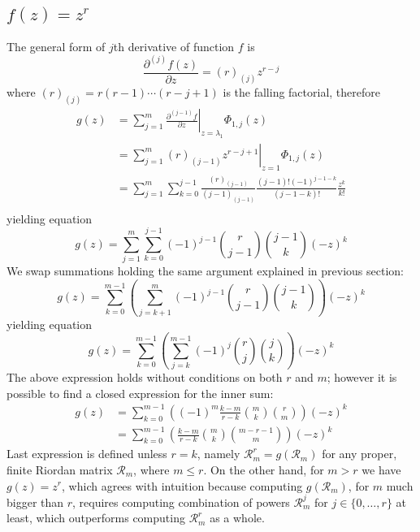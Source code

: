 \subsection{$f(z)=z^{r}$}

The general form of $j$th derivative of function $f$ is 
$$\frac{\partial^{(j)}{f}(z)}{\partial{z}} = (r)_{(j)} z^{r-j}$$ 
where $(r)_{(j)} = r(r-1)\cdots(r-j+1)$ is the falling factorial, therefore
\begin{displaymath}
\begin{split}
  g(z) &= \sum_{j=1}^{m}{ \left. \frac{\partial^{(j-1)}{f}}{\partial{z}} \right|_{z=\lambda_{1}}\Phi_{1,j}(z)} \\
       &= \sum_{j=1}^{m}{ \left. (r)_{(j-1)} z^{r-j+1} \right|_{z=1}\Phi_{1,j}(z)} \\
       &= \sum_{j=1}^{m}{\sum_{k=0}^{j-1}{\frac{(r)_{(j-1)}}{(j-1)_{(j-1)}}\frac{(j-1)!(-1)^{j-1-k}}{(j-1-k)!}\frac{z^{k}}{k!}}} \\
\end{split}
\end{displaymath}
yielding equation
\begin{equation}
  g(z) = \sum_{j=1}^{m}{\sum_{k=0}^{j-1}{(-1)^{j-1}{{r}\choose{j-1}}{{j-1}\choose{k}}(-z)^{k}}} 
\end{equation}
We swap summations holding the same argument explained in previous section:
\begin{displaymath}
  g(z) = \sum_{k=0}^{m-1}{\left(\sum_{j=k+1}^{m}{(-1)^{j-1}{{r}\choose{j-1}}{{j-1}\choose{k}}}\right)(-z)^{k}}
\end{displaymath}
yielding equation
\begin{equation}
  g(z) = \sum_{k=0}^{m-1}{\left(\sum_{j=k}^{m-1}{(-1)^{j}{{r}\choose{j}}{{j}\choose{k}}}\right)(-z)^{k}}
\end{equation}
The above expression holds without conditions on both $r$ and $m$; however it is possible 
to find a closed expression for the inner sum:
\begin{eqnarray}
  g(z) &= \sum_{k=0}^{m-1}{\left(\left(-1\right)^{m}\frac{ k - m }{r-k}{\binom{m}{k}} {\binom{r}{m}}\right)(-z)^{k}}\\
       &= \sum_{k=0}^{m-1}{\left(\frac{ k - m }{r-k}{\binom{m}{k}} {\binom{m-r-1}{m}}\right)(-z)^{k}}
\end{eqnarray}
Last expression is defined unless $r=k$, namely $\mathcal{R}_{m}^{r}=g(\mathcal{R}_{m})$ for any proper, 
finite Riordan matrix $\mathcal{R}_{m}$, where $m\leq r$. On the other hand, for $m>r$ we have 
$g(z)=z^{r}$, which agrees with intuition because computing $g(\mathcal{R}_{m})$, for $m$ much bigger than $r$, 
requires computing combination of powers $\mathcal{R}_{m}^{j}$ for $j\in \lbrace 0,\ldots,r \rbrace$ at least,
which outperforms computing $\mathcal{R}_{m}^{r}$ as a whole.

